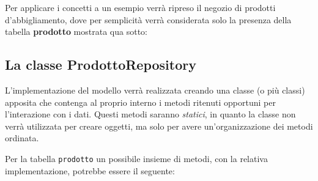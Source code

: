 Per applicare i concetti a un esempio verrà ripreso il negozio di
prodotti d'abbigliamento, dove per semplicità verrà considerata solo la
presenza della tabella \textbf{prodotto} mostrata qua sotto:

\begin{Shaded}
\begin{Highlighting}[]
\NormalTok{\}}
\end{Highlighting}
\end{Shaded}

\hypertarget{la-classe-prodottorepository}{%
\subsection{La classe
ProdottoRepository}\label{la-classe-prodottorepository}}

L'implementazione del modello verrà realizzata creando una classe (o più
classi) apposita che contenga al proprio interno i metodi ritenuti
opportuni per l'interazione con i dati. Questi metodi saranno
\emph{statici}, in quanto la classe non verrà utilizzata per creare
oggetti, ma solo per avere un'organizzazione dei metodi ordinata.

Per la tabella \texttt{prodotto} un possibile insieme di metodi, con la
relativa implementazione, potrebbe essere il seguente:

